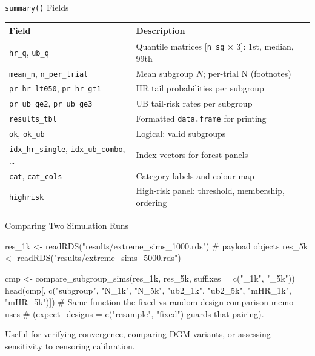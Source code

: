 \documentclass[
  11pt,
  ignorenonframetext,
  aspectratio=169,
]{beamer}
\newenvironment{Shaded}{\begin{snugshade}}{\end{snugshade}}
\newcommand{\AttributeTok}[1]{\textcolor[rgb]{0.40,0.45,0.13}{#1}}
\newcommand{\CommentTok}[1]{\textcolor[rgb]{0.37,0.37,0.37}{#1}}
\newcommand{\FunctionTok}[1]{\textcolor[rgb]{0.28,0.35,0.67}{#1}}
\newcommand{\NormalTok}[1]{\textcolor[rgb]{0.00,0.23,0.31}{#1}}
\newcommand{\OtherTok}[1]{\textcolor[rgb]{0.00,0.23,0.31}{#1}}
\newcommand{\StringTok}[1]{\textcolor[rgb]{0.13,0.47,0.30}{#1}}
\begin{document}
\begin{frame}{\texttt{summary()} Fields}
\protect{}\label{summary-fields}
\footnotesize

\begin{tabular}{lp{8.5cm}}
\toprule
\textbf{Field} & \textbf{Description} \\
\midrule
\texttt{hr\_q}, \texttt{ub\_q} & Quantile matrices [\texttt{n\_sg} $\times$ 3]: 1st, median, 99th \\
\texttt{mean\_n}, \texttt{n\_per\_trial} & Mean subgroup $N$; per-trial N (footnotes) \\
\texttt{pr\_hr\_lt050}, \texttt{pr\_hr\_gt1} & HR tail probabilities per subgroup \\
\texttt{pr\_ub\_ge2}, \texttt{pr\_ub\_ge3} & UB tail-risk rates per subgroup \\
\texttt{results\_tbl} & Formatted \texttt{data.frame} for printing \\
\texttt{ok}, \texttt{ok\_ub} & Logical: valid subgroups \\
\texttt{idx\_hr\_single}, \texttt{idx\_ub\_combo}, \ldots & Index vectors for forest panels \\
\texttt{cat}, \texttt{cat\_cols} & Category labels and colour map \\
\texttt{highrisk} & High-risk panel: threshold, membership, ordering \\
\bottomrule
\end{tabular}
\end{frame}

\begin{frame}[fragile]{Comparing Two Simulation Runs}
\protect{}\label{comparing-two-simulation-runs}
\footnotesize

\begin{Shaded}
\begin{Highlighting}[]
\NormalTok{res\_1k }\OtherTok{\textless{}{-}} \FunctionTok{readRDS}\NormalTok{(}\StringTok{"results/extreme\_sims\_1000.rds"}\NormalTok{)   }\CommentTok{\# payload objects}
\NormalTok{res\_5k }\OtherTok{\textless{}{-}} \FunctionTok{readRDS}\NormalTok{(}\StringTok{"results/extreme\_sims\_5000.rds"}\NormalTok{)}

\NormalTok{cmp }\OtherTok{\textless{}{-}} \FunctionTok{compare\_subgroup\_sims}\NormalTok{(res\_1k, res\_5k,}
                             \AttributeTok{suffixes =} \FunctionTok{c}\NormalTok{(}\StringTok{"\_1k"}\NormalTok{, }\StringTok{"\_5k"}\NormalTok{))}
\FunctionTok{head}\NormalTok{(cmp[, }\FunctionTok{c}\NormalTok{(}\StringTok{"subgroup"}\NormalTok{, }\StringTok{"N\_1k"}\NormalTok{, }\StringTok{"N\_5k"}\NormalTok{, }\StringTok{"ub2\_1k"}\NormalTok{, }\StringTok{"ub2\_5k"}\NormalTok{,}
             \StringTok{"mHR\_1k"}\NormalTok{, }\StringTok{"mHR\_5k"}\NormalTok{)])}
\CommentTok{\# Same function the fixed{-}vs{-}random design{-}comparison memo uses}
\CommentTok{\# (expect\_designs = c("resample", "fixed") guards that pairing).}
\end{Highlighting}
\end{Shaded}

Useful for verifying convergence, comparing DGM variants, or assessing
sensitivity to censoring calibration.
\end{frame}
\end{document}
